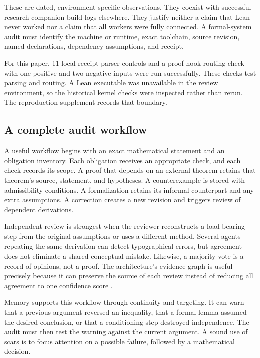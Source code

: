 These are dated, environment-specific observations. They coexist with successful research-companion build logs elsewhere. They justify neither a claim that Lean never worked nor a claim that all workers were fully connected. A formal-system audit must identify the machine or runtime, exact toolchain, source revision, named declarations, dependency assumptions, and receipt.

For this paper, 11 local receipt-parser controls and a proof-hook routing check with one positive and two negative inputs were run successfully. These checks test parsing and routing. A Lean executable was unavailable in the review environment, so the historical kernel checks were inspected rather than rerun. The reproduction supplement records that boundary.

\subsection{A complete audit workflow}

A useful workflow begins with an exact mathematical statement and an obligation inventory. Each obligation receives an appropriate check, and each check records its scope. A proof that depends on an external theorem retains that theorem's source, statement, and hypotheses. A counterexample is stored with admissibility conditions. A formalization retains its informal counterpart and any extra assumptions. A correction creates a new revision and triggers review of dependent derivations.

Independent review is strongest when the reviewer reconstructs a load-bearing step from the original assumptions or uses a different method. Several agents repeating the same derivation can detect typographical errors, but agreement does not eliminate a shared conceptual mistake. Likewise, a majority vote is a record of opinions, not a proof. The architecture's evidence graph is useful precisely because it can preserve the source of each review instead of reducing all agreement to one confidence score \citep{canonical,matharchitecture}.

Memory supports this workflow through continuity and targeting. It can warn that a previous argument reversed an inequality, that a formal lemma assumed the desired conclusion, or that a conditioning step destroyed independence. The audit must then test the warning against the current argument. A sound use of scars is to focus attention on a possible failure, followed by a mathematical decision.
